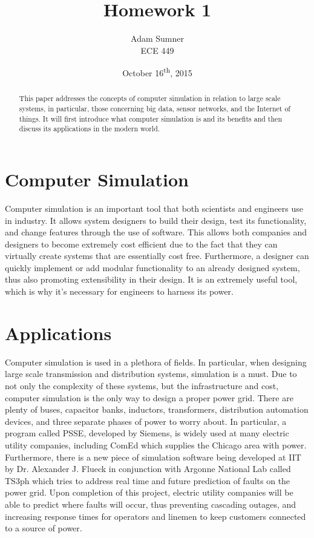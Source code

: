 \documentclass[12pt]{article}
\title{\textbf{Homework 1}}
\author{Adam Sumner \\ ECE 449}
\date{October 16\textsuperscript{th}, 2015}
\begin{document}
\maketitle

\begin{abstract}
This paper addresses the concepts of computer simulation in relation to large scale systems, in particular, those concerning big data, sensor networks, and the Internet of things. It will first introduce what computer simulation is and its benefits and then discuss its applications in the modern world.
\end{abstract}

\section{Computer Simulation}
Computer simulation is an important tool that both scientists and engineers use in industry. It allows system designers to build their design, test its functionality, and change features through the use of software. This allows both companies and designers to become extremely cost efficient due to the fact that they can virtually create systems that are essentially cost free. Furthermore, a designer can quickly implement or add modular functionality to an already designed system, thus also promoting extensibility in their design. It is an extremely useful tool, which is why it's necessary for engineers to harness its power.

\section{Applications}
Computer simulation is used in a plethora of fields. In particular, when designing large scale transmission and distribution systems, simulation is a must. Due to not only the complexity of these systems, but the infrastructure and cost, computer simulation is the only way to design a proper power grid. There are plenty of buses, capacitor banks, inductors, transformers, distribution automation devices, and three separate phases of power to worry about. In particular, a program called PSSE, developed by Siemens, is widely used at many electric utility companies, including ComEd which supplies the Chicago area with power. Furthermore, there is a new piece of simulation software being developed at IIT by Dr. Alexander J. Flueck in conjunction with Argonne National Lab called TS3ph which tries to address real time and future prediction of faults on the power grid. Upon completion of this project, electric utility companies will be able to predict where faults will occur, thus preventing cascading outages, and increasing response times for operators and linemen to keep customers connected to a source of power.
\end{document}
